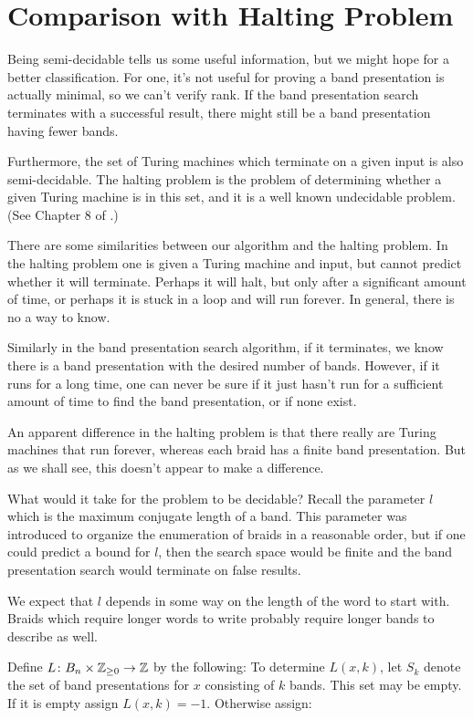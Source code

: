 \documentclass[12pt]{thesis}
\begin{document}
\section{Comparison with Halting Problem}

Being semi-decidable tells us some useful information, but we might hope for a better classification.
For one, it's not useful for proving a band presentation is actually minimal,
so we can't verify rank.
If the band presentation search terminates with a successful result, there might
still be a band presentation having fewer bands.

Furthermore, the set of Turing machines which terminate on a given input is also semi-decidable.
The halting problem is the problem of determining whether a given Turing machine is in this set,
and it is a well known undecidable problem. (See Chapter 8 of \cite{computation}.)

There are some similarities between our algorithm and the halting problem.
In the halting problem one is given a Turing machine and input, but cannot predict whether it will terminate.
Perhaps it will halt, but only after a significant amount of time, or perhaps it is stuck in a loop and will run forever.
In general, there is no a way to know.

Similarly in the band presentation search algorithm, if it terminates,
we know there is a band presentation with the desired number of bands.
However, if it runs for a long time, one can never be sure if it just hasn't run for a sufficient amount
of time to find the band presentation, or if none exist.

An apparent difference in the halting problem is that there
really are Turing machines that run forever, whereas each braid
has a finite band presentation. 
But as we shall see, this doesn't appear to make a difference.

What would it take for the problem to be decidable? 
Recall the parameter $l$ which is the maximum conjugate length of a band.
This parameter was introduced to organize the enumeration of braids in a reasonable order,
but if one could predict a bound for $l$, then the search space would be finite and the band presentation search would
terminate on false results.

We expect that $l$ depends in some way on the length
of the word to start with.
Braids which require longer words to write
probably require longer bands to describe as well.

    Define $L \colon B_{n} \times \mathbb{Z}_{\geq 0} \rightarrow \mathbb{Z}$
    by the following:
    To determine $L(x, k)$,
    let $S_{k}$ denote the set of band presentations for $x$ 
    consisting of $k$ bands.
    This set may be empty.
    If it is empty assign $L(x, k) = -1$.
    Otherwise assign:
\end{document}
